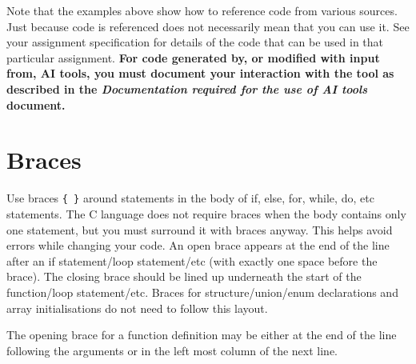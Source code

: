 \documentclass{article}
\begin{document}
\linenumbers

Note that the examples above show how to reference code from various sources. Just because code is referenced
does not necessarily mean that you can use it. See your assignment specification for details of the code that can
be used in that particular assignment. \textbf{For code generated by, or modified with input from, AI tools, you must
document your interaction with the tool as described in the \textit{Documentation required for the use of AI tools} document.}

\section{Braces}
Use braces \texttt{\{ \}} around statements in the body of if, else, for, while, do, etc statements.
The C language does not require braces when the body contains only one statement, but you must 
surround it with braces anyway.
This helps avoid errors while changing your code.
An open brace appears at the end of the line after an if statement/loop statement/etc (with exactly 
one space before the brace).
The closing brace should be lined up underneath the start of the function/loop statement/etc.
Braces for structure/union/enum declarations and array initialisations do not need to follow this layout.

The opening brace for a function definition may be either at the end of the line following the 
arguments or in the left most column of the next line.
\end{document}
